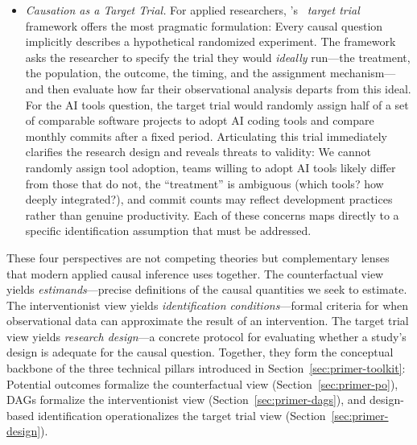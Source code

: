 \begin{itemize}[leftmargin=15pt]
    All causal inference methods, in some sense, are trying to close the gap between passive observation (i.e., conditioning on $X$) and active intervention (i.e., intervening on $X$).
    \item \emph{Causation as a Target Trial.} For applied researchers, \citeauthor{hernan2020causal}'s~\cite{hernan2020causal} \emph{target trial} framework offers the most pragmatic formulation: Every causal question implicitly describes a hypothetical randomized experiment.
    The framework asks the researcher to specify the trial they would \emph{ideally} run---the treatment, the population, the outcome, the timing, and the assignment mechanism---and then evaluate how far their observational analysis departs from this ideal.
    For the AI tools question, the target trial would randomly assign half of a set of comparable software projects to adopt AI coding tools and compare monthly commits after a fixed period.
    Articulating this trial immediately clarifies the research design and reveals threats to validity: We cannot randomly assign tool adoption, teams willing to adopt AI tools likely differ from those that do not, the ``treatment'' is ambiguous (which tools? how deeply integrated?), and commit counts may reflect development practices rather than genuine productivity.
    Each of these concerns maps directly to a specific identification assumption that must be addressed.  
\end{itemize}
These four perspectives are not competing theories but complementary lenses that modern applied causal inference uses together.
The counterfactual view yields \emph{estimands}---precise definitions of the causal quantities we seek to estimate.
The interventionist view yields \emph{identification conditions}---formal criteria for when observational data can approximate the result of an intervention.
The target trial view yields \emph{research design}---a concrete protocol for evaluating whether a study's design is adequate for the causal question.
Together, they form the conceptual backbone of the three technical pillars introduced in Section~\ref{sec:primer-toolkit}: Potential outcomes formalize the counterfactual view (Section~\ref{sec:primer-po}), DAGs formalize the interventionist view (Section~\ref{sec:primer-dags}), and design-based identification operationalizes the target trial view (Section~\ref{sec:primer-design}).
